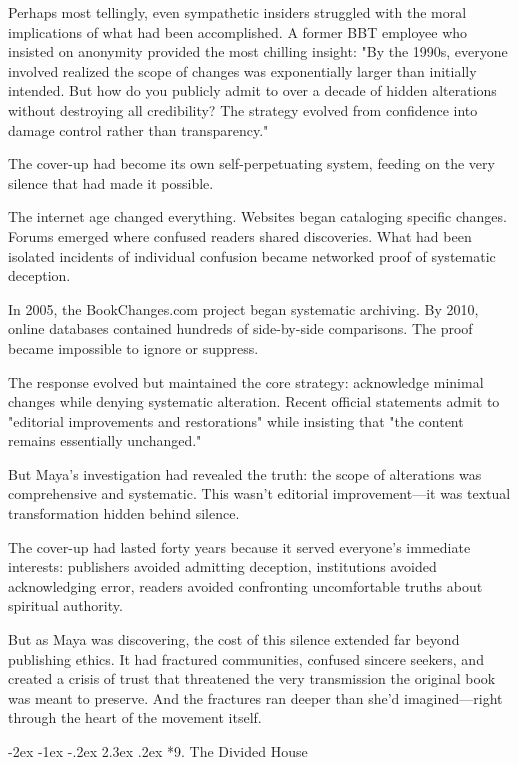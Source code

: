\documentclass[12pt,twoside]{book}
\makeatletter
\renewcommand\section{\@startsection{section}{1}{\z@}%
{-3.5ex \@plus -1ex \@minus -.2ex}%
{2.3ex \@plus.2ex}%
{\normalfont\Large\bfseries}}
\let\oldsection\section
\renewcommand{\section}[1]{\needspace{4\baselineskip}\oldsection{#1}}
\def\cleardoublepage{\clearpage\if@twoside \ifodd\c@page\else\hbox{}\thispagestyle{empty}\newpage\if@twocolumn\hbox{}\newpage\fi\fi\fi}
\renewcommand\section{\@startsection{section}{1}{\z@}%
{-2ex \@plus -1ex \@minus -.2ex}%
{2.3ex \@plus.2ex}%
{\normalfont\Large\bfseries}}
\makeatother
\begin{document}
Perhaps most tellingly, even sympathetic insiders struggled with the moral implications of what had been accomplished. A former BBT employee who insisted on anonymity provided the most chilling insight: "By the 1990s, everyone involved realized the scope of changes was exponentially larger than initially intended. But how do you publicly admit to over a decade of hidden alterations without destroying all credibility? The strategy evolved from confidence into damage control rather than transparency."

The cover-up had become its own self-perpetuating system, feeding on the very silence that had made it possible.

The internet age changed everything. Websites began cataloging specific changes. Forums emerged where confused readers shared discoveries. What had been isolated incidents of individual confusion became networked proof of systematic deception.

In 2005, the BookChanges.com project began systematic archiving. By 2010, online databases contained hundreds of side-by-side comparisons. The proof became impossible to ignore or suppress.

The response evolved but maintained the core strategy: acknowledge minimal changes while denying systematic alteration. Recent official statements admit to "editorial improvements and restorations" while insisting that "the content remains essentially unchanged."

But Maya's investigation had revealed the truth: the scope of alterations was comprehensive and systematic. This wasn't editorial improvement—it was textual transformation hidden behind silence.

The cover-up had lasted forty years because it served everyone's immediate interests: publishers avoided admitting deception, institutions avoided acknowledging error, readers avoided confronting uncomfortable truths about spiritual authority.

But as Maya was discovering, the cost of this silence extended far beyond publishing ethics. It had fractured communities, confused sincere seekers, and created a crisis of trust that threatened the very transmission the original book was meant to preserve. And the fractures ran deeper than she'd imagined—right through the heart of the movement itself.

\cleardoublepage
\vspace*{0.20\textheight}
\section*{9. The Divided House}
\thispagestyle{chapterpage}
\end{document}
